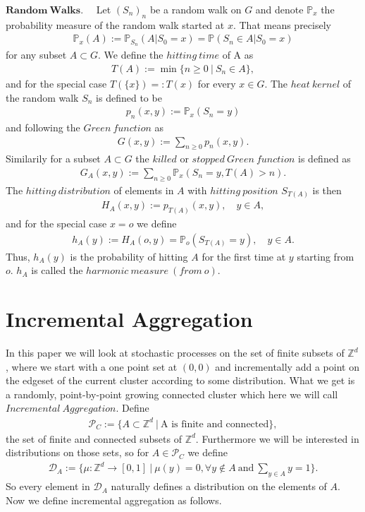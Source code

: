 \documentclass[12pt,a4paper]{scrartcl}
\numberwithin{equation}{section}
\numberwithin{equation}{section}%
\theoremstyle{definition}
\theoremstyle{definition}
\begin{document}
\noindent $\boldsymbol{Random\ Walks}.\quad$ Let $(S_n)_n$ be a random walk on $G$ and denote $\mathbb{P}_x$ the probability measure of the random walk started at $x$. That means precisely 
\begin{align*}
	\mathbb{P}_x(A) := \mathbb{P}_{S_n}(A|S_0=x) = \mathbb{P}(S_n\in A|S_0=x)
\end{align*}
for any subset $A\subset G$. We define the $hitting\ time$ of A as 
\begin{align*}
	T(A) := \min \{n\geq 0\ |\ S_n\in A\},
\end{align*}
and for the special case $T(\{x\})=:T(x)$ for every $x\in G$. The $heat\ kernel$ of the random walk $S_n$ is defined to be 
\begin{align*}
	p_n(x,y):=\mathbb{P}_x(S_n=y)
\end{align*}
and following the $Green\ function$ as 
\begin{align*}
	G(x,y) := \sum_{n\geq 0} p_n(x,y).
\end{align*}
Similarily for a subset $A\subset G$ the $killed$ or $stopped\ Green\ function$ is defined as
\begin{align*}
	G_A(x,y) := \sum_{n\geq 0} \mathbb{P}_x(S_n=y, T(A) > n).
\end{align*} 
\noindent The $hitting\ distribution$ of elements in $A$ with $hitting\ position$ $S_{T(A)}$ is then
\begin{align*}
	H_A(x,y) := p_{T(A)}(x,y),\quad y\in A, 
\end{align*}
and for the special case $x=o$ we define
\begin{align*}
	h_A(y) := H_A(o,y) = \mathbb{P}_o(S_{T(A)}=y),\quad y\in A.
\end{align*}
Thus, $h_A(y)$ is the probability of hitting $A$ for the first time at $y$ starting from $o$. $h_A$ is called the $harmonic\ measure\ (from\ o)$.

\section{Incremental Aggregation}
In this paper we will look at stochastic processes on the set of finite subsets of $\mathbb{Z}^d$, where we start with a one point set at $(0,0)$ and incrementally add a point on the edgeset of the current cluster according to some distribution. What we get is a randomly, point-by-point growing connected cluster which here we will call $\mathit{Incremental\ Aggregation}$. Define 
\begin{align}
	\mathcal{P}_C := \{A\subset \mathbb{Z}^d\ |\ \text{A is finite and connected}\}, 
\end{align}
the set of finite and connected subsets of $\mathbb{Z}^d$. Furthermore we will be interested in distributions on those sets, so for $A\in \mathcal{P}_C$ we define 
\begin{align}
	\mathcal{D}_A:= \{\mu: \mathbb{Z}^d\to [0,1]\ |\ \mu(y) = 0, \forall y\notin A\ \text{and}\ \sum_{y\in A} y = 1 \}.
\end{align}
So every element in $\mathcal{D}_A$ naturally defines a distribution on the elements of $A$. Now we define incremental aggregation as follows.  
\end{document}
